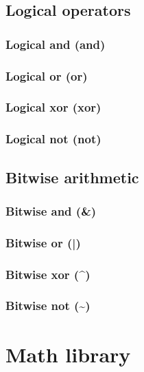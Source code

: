 \documentclass{article}
\theoremstyle{definition}
\begin{document}
\subsection{Logical operators}

\subsubsection{Logical and (and)}

\subsubsection{Logical or (or)}

\subsubsection{Logical xor (xor)}

\subsubsection{Logical not (not)}

\subsection{Bitwise arithmetic}

\subsubsection{Bitwise and (\&)}
\libfcn{\&}

\subsubsection{Bitwise or (|)}
\libfcn{|}

\subsubsection{Bitwise xor (\^{})}
\libfcn{\^{}}

\subsubsection{Bitwise not (\textasciitilde{})}

\pagebreak

\section{Math library}
\end{document}
